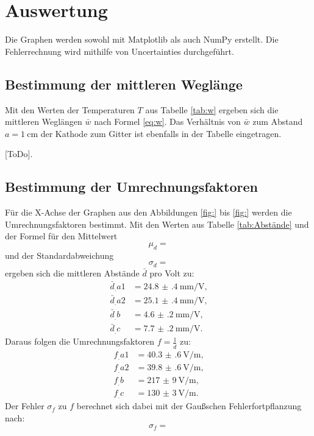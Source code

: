 \section{Auswertung}
\label{sec:Auswertung}

Die Graphen werden sowohl mit Matplotlib \cite{matplotlib} als auch NumPy \cite{numpy} erstellt. Die Fehlerrechnung wird mithilfe von Uncertainties \cite{uncertainties} durchgeführt.

\subsection{Bestimmung der mittleren Weglänge}

Mit den Werten der Temperaturen $T$ aus Tabelle \ref{tab:w} ergeben sich die mittleren Weglängen $\bar{w}$ nach Formel \eqref{eq:w}. Das Verhältnis von $\bar{w}$ zum Abstand $a=\SI{1}{\centi\metre}$ der Kathode zum Gitter ist ebenfalls in der Tabelle eingetragen. 

\begin{table}
\centering
\caption{[ToDo].}

\label{tab:w}
\end{table}

\subsection{Bestimmung der Umrechnungsfaktoren}

Für die X-Achse der Graphen aus den Abbildungen \ref{fig:} bis \ref{fig:} werden die Umrechnungsfaktoren bestimmt.
Mit den Werten aus Tabelle \ref{tab:Abstände} und der Formel für den Mittelwert
\[
\mu_d = 
\]
und der Standardabweichung
\[
\sigma_d = 
\]
ergeben sich die mittleren Abstände $\bar{d}$ pro Volt zu:
\begin{align*}
\bar{d}_.{a1} &= \SI{24.8(4)}{\milli\metre\per\volt}\text{,}\\
\bar{d}_.{a2} &= \SI{25.1(4)}{\milli\metre\per\volt}\text{,}\\
\bar{d}_.{b}  &= \SI{4.6(2)}{\milli\metre\per\volt}\text{,}\\
\bar{d}_.{c}  &= \SI{7.7(2)}{\milli\metre\per\volt}\text{.}
\end{align*}
Daraus folgen die Umrechnungsfaktoren $f=\frac{1}{\bar{d}}$ zu:
\begin{align}
f_.{a1} &= \SI{40.3(6)}{\volt\per\metre}\text{,}\\
f_.{a2} &= \SI{39.8(6)}{\volt\per\metre}\text{,}\\
f_.{b}  &= \SI{217(9)}{\volt\per\metre}\text{,}\\
f_.{c}  &= \SI{130(3)}{\volt\per\metre}\text{.}
\end{align}
Der Fehler $\sigma_{f}$ zu $f$ berechnet sich dabei mit der Gaußschen Fehlerfortpflanzung nach:
\[
\sigma_{f} = 
\]

